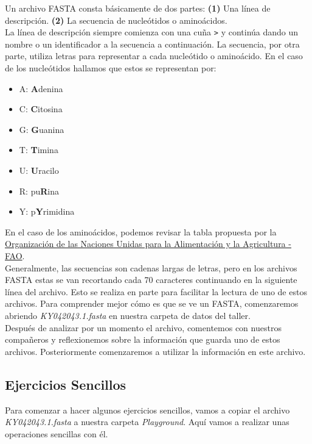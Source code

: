 \documentclass[10pt,letterpaper]{article}
\newcommand{\inlinecode}[1]{
\colorbox{light-gray}{\texttt{#1}}
}
\begin{document}
Un archivo FASTA consta b\'asicamente de dos partes: \textbf{(1)} Una l\'inea de descripci\'on. \textbf{(2)} La secuencia de nucle\'otidos o amino\'acidos.\\

La l\'inea de descripci\'on siempre comienza con una cu\~na \inlinecode{>} y contin\'ua dando un nombre o un identificador a la secuencia a continuaci\'on. La secuencia, por otra parte, utiliza letras para representar a cada nucle\'otido o amino\'acido. En el caso de los nucle\'otidos hallamos que estos se representan por:

\begin{itemize}
\item A: \textbf{A}denina
\item C: \textbf{C}itosina
\item G: \textbf{G}uanina
\item T: \textbf{T}imina
\item U: \textbf{U}racilo
\item R: pu\textbf{R}ina
\item Y: p\textbf{Y}rimidina
\end{itemize}

En el caso de los amino\'acidos, podemos revisar la tabla propuesta por la \href{http://www.fao.org/docrep/004/y2775e/y2775e0e.htm}{Organizaci\'on de las Naciones Unidas para la Alimentaci\'on y la Agricultura - FAO}.\\

Generalmente, las secuencias son cadenas largas de letras, pero en los archivos FASTA estas se van recortando cada 70 caracteres continuando en la siguiente l\'inea del archivo. Esto se realiza en parte para facilitar la lectura de uno de estos archivos. Para comprender mejor c\'omo es que se ve un FASTA, comenzaremos abriendo \textit{KY042043.1.fasta} en nuestra carpeta de datos del taller.\\

Despu\'es de analizar por un momento el archivo, comentemos con nuestros compa\~neros y reflexionemos sobre la informaci\'on que guarda uno de estos archivos. Posteriormente comenzaremos a utilizar la informaci\'on en este archivo.

\subsection{Ejercicios Sencillos}
Para comenzar a hacer algunos ejercicios sencillos, vamos a copiar el archivo \textit{KY042043.1.fasta} a nuestra carpeta \textit{Playground}. Aqu\'i vamos a realizar unas operaciones sencillas con \'el.
\end{document}
